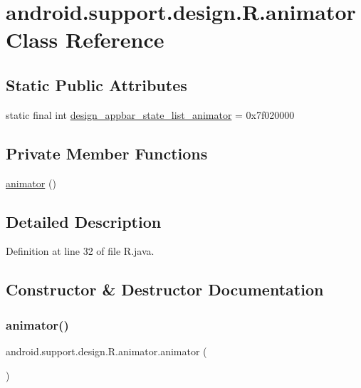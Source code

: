 \hypertarget{classandroid_1_1support_1_1design_1_1_r_1_1animator}{}\section{android.\+support.\+design.\+R.\+animator Class Reference}
\label{classandroid_1_1support_1_1design_1_1_r_1_1animator}
\subsection*{Static Public Attributes}
\begin{DoxyCompactItemize}
\item 
static final int \mbox{\hyperlink{classandroid_1_1support_1_1design_1_1_r_1_1animator_a2a7ecd7d450a8c927648ee2ed48886bf}{design\+\_\+appbar\+\_\+state\+\_\+list\+\_\+animator}} = 0x7f020000
\end{DoxyCompactItemize}
\subsection*{Private Member Functions}
\begin{DoxyCompactItemize}
\item 
\mbox{\hyperlink{classandroid_1_1support_1_1design_1_1_r_1_1animator_a815c72f7b69f5a067ff66b42a0dd09ea}{animator}} ()
\end{DoxyCompactItemize}


\subsection{Detailed Description}


Definition at line 32 of file R.\+java.



\subsection{Constructor \& Destructor Documentation}
\mbox{\label{classandroid_1_1support_1_1design_1_1_r_1_1animator_a815c72f7b69f5a067ff66b42a0dd09ea}} 
\subsubsection{\texorpdfstring{animator()}{animator()}}
{\footnotesize\ttfamily android.\+support.\+design.\+R.\+animator.\+animator (\begin{DoxyParamCaption}{ }\end{DoxyParamCaption})\hspace{0.3cm}{\ttfamily [private]}}



